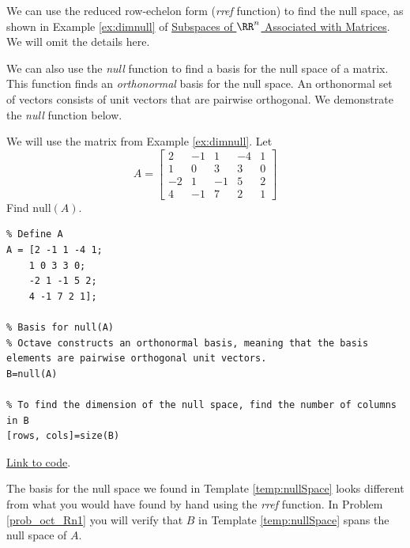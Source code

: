 \documentclass{ximera}
\begin{document}
We can use the reduced row-echelon form (\emph{rref} function) to find the null space, as shown in Example \ref{ex:dimnull} of \href{https://ximera.osu.edu/linearalgebradzv3/LinearAlgebraInteractiveIntro/VSP-0040/main}{Subspaces of $\RR^n$ Associated with Matrices}.  We will omit the details here.
 
We can also use the \emph{null} function to find a basis for the null space of a matrix.  This function finds an \emph{orthonormal} basis for the null space.  An orthonormal set of vectors consists of unit vectors that are pairwise orthogonal.  We demonstrate the \emph{null} function below.
 
\begin{template}\label{temp:nullSpace}
    We will use the matrix from Example \ref{ex:dimnull}.  Let
$$A=\begin{bmatrix}2&-1&1&-4&1\\1&0&3&3&0\\-2&1&-1&5&2\\4&-1&7&2&1\end{bmatrix}$$
Find $\mbox{null}(A)$.
 
\begin{verbatim}
% Define A
A = [2 -1 1 -4 1;
    1 0 3 3 0;
    -2 1 -1 5 2;
    4 -1 7 2 1];
 
% Basis for null(A)
% Octave constructs an orthonormal basis, meaning that the basis elements are pairwise orthogonal unit vectors.
B=null(A)
 
% To find the dimension of the null space, find the number of columns in B
[rows, cols]=size(B)
\end{verbatim}
 
\href{https://sagecell.sagemath.org/?z=eJxFj0FrwzAMhe-B_Id3KbTQjCbr2GHkkLD7LruVHlxXaQ2JVCynhf36yW3ZLDDo83t68gKfNAQmdGXRocWuQVWjRrVF_VEWsFNjg1erzbOvmvxe4w3Nk2xz-w7jeyNlsUDvNCgGieB5HJfdKsMvn9yV4IU1xdknhWNITGdhiZMbcciuNSZyHPiEdHbJLnpw0EgTcXZFwsWFeAtKD_9J2Owzh4Qr-SRRX8qib_-yc_q3wD56vA88BpukQSx-uIOshF6cp_W_iufpQDFLvIzzxIrA6MtiF-VmaxrUfavhh5b96hc072Hf&lang=octave&interacts=eJyLjgUAARUAuQ==}{Link to code}.
\end{template}
 
The basis for the null space we found in Template \ref{temp:nullSpace} looks different from what you would have found by hand using the \emph{rref} function. In Problem \ref{prob_oct_Rn1} you will verify that $B$ in Template \ref{temp:nullSpace} spans the null space of $A$.
 
\end{document}
